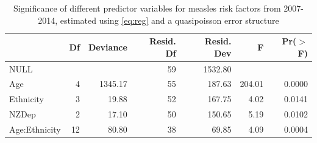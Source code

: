 \documentclass{article}
\begin{document}
\vspace{5mm} %
\begin{table}
\begin{tabular}{lrrrrrr}
  \hline
 & Df & Deviance & Resid. Df & Resid. Dev & F & Pr($>$F) \\ 
  \hline
NULL &  &  & 59 & 1532.80 &  &  \\ 
  Age & 4 & 1345.17 & 55 & 187.63 & 204.01 & 0.0000 \\ 
  Ethnicity & 3 & 19.88 & 52 & 167.75 & 4.02 & 0.0141 \\ 
  NZDep & 2 & 17.10 & 50 & 150.65 & 5.19 & 0.0102 \\ 
  Age:Ethnicity & 12 & 80.80 & 38 & 69.85 & 4.09 & 0.0004 \\ 
   \hline
\end{tabular}\caption{Significance of different predictor variables for measles risk factors from 2007-2014, estimated using \autoref{eq:reg} and a quasipoisson error structure}
\label{table:anova}
\end{table}
\end{document}
